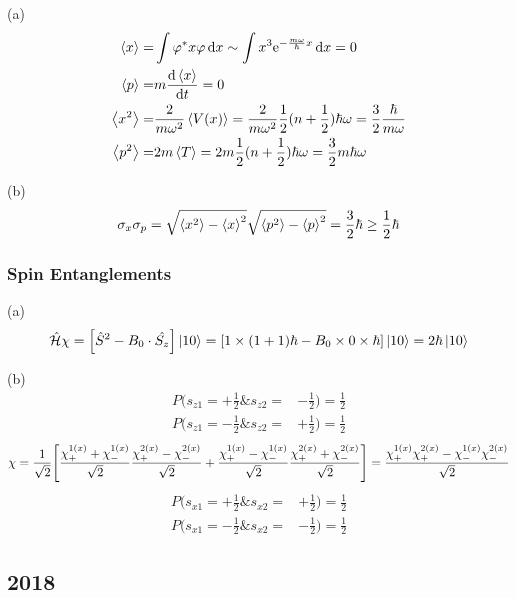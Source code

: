 (a)
\begin{align*}
    \expval{x} =   & \int \varphi^* x \varphi \dd{x} \sim \int x^3 \mathrm{e}^{- \frac{m \omega}{\hbar} x} \dd{x} = 0                                                \\
    \expval{p} =   & m \dv{\expval{x}}{t} = 0                                                                                                                  \\
    \expval{x^2} = & \frac{2}{m \omega^2} \expval{V(x)} = \frac{2}{m \omega^2} \frac{1}{2} (n + \frac{1}{2}) \hbar \omega = \frac{3}{2} \frac{\hbar}{m \omega} \\
    \expval{p^2} = & 2 m \expval{T} = 2 m \frac{1}{2} (n + \frac{1}{2}) \hbar \omega = \frac{3}{2} m \hbar \omega
\end{align*}

(b)
\[
    \sigma_x \sigma_p = \sqrt{\expval{x^2} - \expval{x}^2} \sqrt{\expval{p^2} - \expval{p}^2} = \frac{3}{2} \hbar \geq \frac{1}{2} \hbar
\]

\subsubsection{Spin Entanglements}

(a)
\[
    \hat{\mathcal{H}} \chi = \qty[\hat{S}^2 - B_0 \cdot \hat{S_z}] \ket{1 0} = \qty[1 \times (1 + 1) \hbar - B_0 \times 0 \times \hbar] \ket{1 0} = 2 \hbar \ket{1 0}
\]

(b)
\begin{align*}
    P(s_{z1} = + \frac{1}{2} \& s_{z2} = & - \frac{1}{2}) = \frac{1}{2} \\
    P(s_{z1} = - \frac{1}{2} \& s_{z2} = & + \frac{1}{2}) = \frac{1}{2}
\end{align*} \begin{align*}
    \chi = \frac{1}{\sqrt{2}} \qty[\frac{\chi_+^{1(x)} + \chi_-^{1(x)}}{\sqrt{2}} \frac{\chi_+^{2(x)} - \chi_-^{2(x)}}{\sqrt{2}} + \frac{\chi_+^{1(x)} - \chi_-^{1(x)}}{\sqrt{2}} \frac{\chi_+^{2(x)} + \chi_-^{2(x)}}{\sqrt{2}}] = \frac{\chi_+^{1(x)} \chi_+^{2(x)} - \chi_-^{1(x)} \chi_-^{2(x)}}{\sqrt{2}}
\end{align*} \begin{align*}
    P(s_{x1} = + \frac{1}{2} \& s_{x2} = & + \frac{1}{2}) = \frac{1}{2} \\
    P(s_{x1} = - \frac{1}{2} \& s_{x2} = & - \frac{1}{2}) = \frac{1}{2}
\end{align*}

\subsection{2018}

